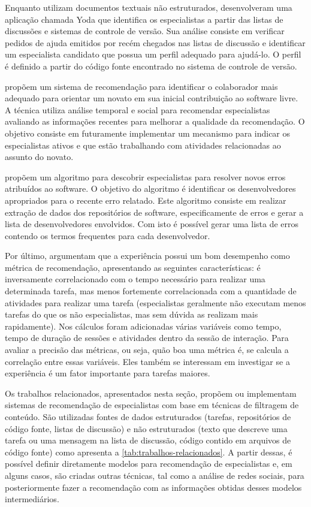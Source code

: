 \documentclass[oneside,brazil,a4paper]{normas-utf-tex}
\begin{document}
Enquanto  utilizam documentos textuais não estruturados,  desenvolveram uma aplicação chamada Yoda que identifica os especialistas a partir das listas de discussões e sistemas de controle de versão. Sua análise consiste em verificar pedidos de ajuda emitidos por recém chegados nas listas de discussão e identificar um especialista candidato que possua um perfil adequado para ajudá-lo. O perfil é definido a partir do código fonte encontrado no sistema de controle de versão.

 propõem um sistema de recomendação  para identificar o colaborador mais adequado para orientar um novato em sua inicial contribuição ao software livre. A técnica utiliza análise temporal e social para recomendar especialistas avaliando as informações recentes para melhorar a qualidade da recomendação. O objetivo consiste em futuramente implementar um mecanismo para indicar os especialistas ativos e que estão trabalhando com atividades relacionadas ao assunto do novato.

 propõem um algoritmo para descobrir especialistas para resolver novos erros atribuídos ao software. O objetivo do algoritmo é identificar os desenvolvedores apropriados para o recente erro relatado. Este algoritmo consiste em realizar extração de dados dos repositórios de software, especificamente de erros e gerar a lista de desenvolvedores envolvidos. Com isto é possível gerar uma lista de erros contendo os termos frequentes para cada desenvolvedor.

Por último,  argumentam que a experiência possui um bom desempenho como métrica de recomendação, apresentando as seguintes características: é inversamente correlacionado com o tempo necessário para realizar uma determinada tarefa, mas menos fortemente correlacionada com a quantidade de atividades para realizar uma tarefa (especialistas geralmente não executam menos tarefas do que os não especialistas, mas sem dúvida as realizam mais rapidamente). Nos cálculos foram adicionadas várias variáveis como tempo, tempo de duração de sessões e atividades dentro da sessão de interação. Para avaliar a precisão das métricas, ou seja, quão boa uma métrica é, se calcula a correlação entre essas variáveis. Eles também se interessam em investigar se a experiência é um fator importante para tarefas maiores.

Os trabalhos relacionados, apresentados nesta seção, propõem ou implementam sistemas de recomendação de especialistas com base em técnicas de filtragem de conteúdo. São utilizadas fontes de dados estruturados (tarefas, repositórios de código fonte, listas de discussão) e não estruturados (texto que descreve uma tarefa ou uma mensagem na lista de discussão, código contido em arquivos de código fonte) como apresenta a \cref{tab:trabalhos-relacionados}. A partir dessas, é possível definir diretamente modelos para recomendação de especialistas e, em alguns casos, são criadas outras técnicas, tal como a análise de redes sociais, para posteriormente fazer a recomendação com as informações obtidas desses modelos intermediários.
\end{document}
